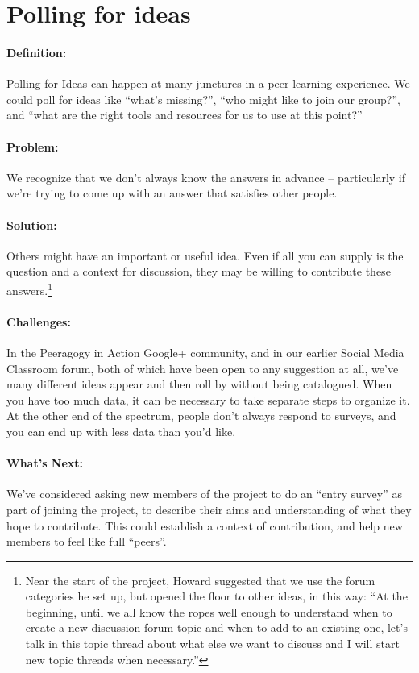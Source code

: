 \section{Polling for ideas}
\paragraph{Definition:} Polling for Ideas can happen at many junctures in a
peer learning experience. We could poll for ideas like ``what's
missing?'', ``who might like to join our group?'', and ``what are the
right tools and resources for us to use at this point?''

\paragraph{Problem:} We recognize that we don't always know the answers in
advance -- particularly if we're trying to come up with an answer that
satisfies other people.

\paragraph{Solution:} Others might have an important or useful idea. Even
if all you can supply is the question and a context for discussion, they
may be willing to contribute these answers.\footnote{Near the start of the project, Howard suggested that
we use the forum categories he set up, but opened the floor to other
ideas, in this way: ``At the beginning, until we all know the ropes well
enough to understand when to create a new discussion forum topic and
when to add to an existing one, let's talk in this topic thread about
what else we want to discuss and I will start new topic threads when
necessary.''}

\paragraph{Challenges:} In the Peeragogy in Action Google+ community, and
in our earlier Social Media Classroom forum, both of which have been
open to any suggestion at all, we've many different ideas appear and
then roll by without being catalogued. When you have too much data, it
can be necessary to take separate steps to organize it. At the other end
of the spectrum, people don't always respond to surveys, and you can end
up with less data than you'd like.

\paragraph{What's Next:} We've considered asking new members of the project
to do an ``entry survey'' as part of joining the project, to describe
their aims and understanding of what they hope to contribute. This could
establish a context of contribution, and help new members to feel like
full ``peers''.
